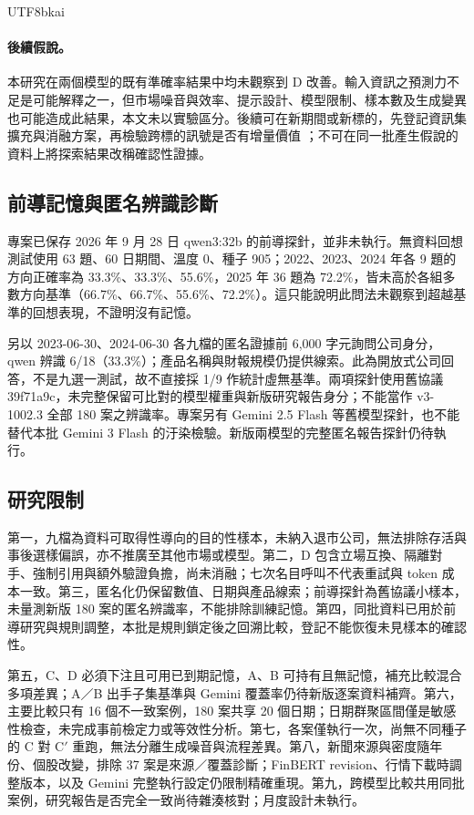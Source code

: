 \documentclass[12pt,a4paper]{article}
\newcommand{\grp}[1]{\textsf{#1}}
\begin{document}
\begin{CJK}{UTF8}{bkai}
\paragraph{後續假說。} 本研究在兩個模型的既有準確率結果中均未觀察到 \grp{D} 改善。輸入資訊之預測力不足是可能解釋之一，但市場噪音與效率、提示設計、模型限制、樣本數及生成變異也可能造成此結果，本文未以實驗區分。後續可在新期間或新標的，先登記資訊集擴充與消融方案，再檢驗跨標的訊號是否有增量價值 \citep{nosek2018prereg}；不可在同一批產生假說的資料上將探索結果改稱確認性證據。

\subsection{前導記憶與匿名辨識診斷}
\label{sec:memorydiagnostic}

專案已保存 2026 年 9 月 28 日 qwen3:32b 的前導探針，並非未執行。無資料回想測試使用 63 題、60 日期間、溫度 0、種子 905；2022、2023、2024 年各 9 題的方向正確率為 33.3\%、33.3\%、55.6\%，2025 年 36 題為 72.2\%，皆未高於各組多數方向基準（66.7\%、66.7\%、55.6\%、72.2\%）。這只能說明此問法未觀察到超越基準的回想表現，不證明沒有記憶。

另以 2023-06-30、2024-06-30 各九檔的匿名證據前 6,000 字元詢問公司身分，qwen 辨識 6/18（33.3\%）；產品名稱與財報規模仍提供線索。此為開放式公司回答，不是九選一測試，故不直接採 1/9 作統計虛無基準。兩項探針使用舊協議 39f71a9c，未完整保留可比對的模型權重與新版研究報告身分；不能當作 v3-1002.3 全部 180 案之辨識率。專案另有 Gemini 2.5 Flash 等舊模型探針，也不能替代本批 Gemini 3 Flash 的汙染檢驗。新版兩模型的完整匿名報告探針仍待執行。

\subsection{研究限制}

第一，九檔為資料可取得性導向的目的性樣本，未納入退市公司，無法排除存活與事後選樣偏誤，亦不推廣至其他市場或模型。第二，\grp{D} 包含立場互換、隔離對手、強制引用與額外驗證負擔，尚未消融；七次名目呼叫不代表重試與 token 成本一致。第三，匿名化仍保留數值、日期與產品線索；前導探針為舊協議小樣本，未量測新版 180 案的匿名辨識率，不能排除訓練記憶。第四，同批資料已用於前導研究與規則調整，本批是規則鎖定後之回溯比較，登記不能恢復未見樣本的確認性。

第五，\grp{C}、\grp{D} 必須下注且可用已到期記憶，\grp{A}、\grp{B} 可持有且無記憶，補充比較混合多項差異；A／B 出手子集基準與 Gemini 覆蓋率仍待新版逐案資料補齊。第六，主要比較只有 16 個不一致案例，180 案共享 20 個日期；日期群聚區間僅是敏感性檢查，未完成事前檢定力或等效性分析。第七，各案僅執行一次，尚無不同種子的 C 對 C$'$ 重跑，無法分離生成噪音與流程差異。第八，新聞來源與密度隨年份、個股改變，排除 37 案是來源／覆蓋診斷；FinBERT revision、行情下載時調整版本，以及 Gemini 完整執行設定仍限制精確重現。第九，跨模型比較共用同批案例，研究報告是否完全一致尚待雜湊核對；月度設計未執行。




\end{CJK}
\end{document}
